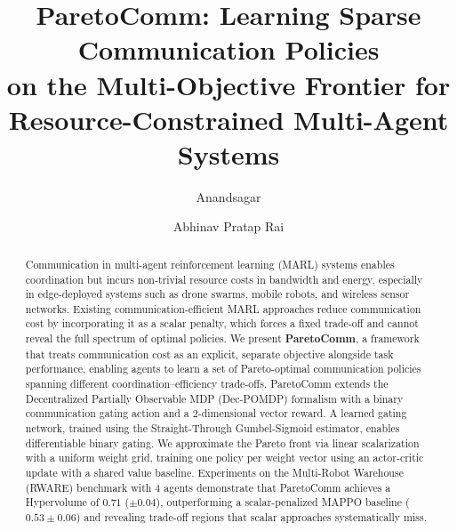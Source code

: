 \documentclass[runningheads]{llncs}
\begin{document}
\title{ParetoComm: Learning Sparse Communication Policies\\
on the Multi-Objective Frontier for\\
Resource-Constrained Multi-Agent Systems}

\author{Anandsagar \and
Abhinav Pratap Rai}



\maketitle

\begin{abstract}
Communication in multi-agent reinforcement learning (MARL) systems
enables coordination but incurs non-trivial resource costs in
bandwidth and energy, especially in edge-deployed systems such as
drone swarms, mobile robots, and wireless sensor networks.
Existing communication-efficient MARL approaches reduce communication
cost by incorporating it as a scalar penalty, which forces a fixed
trade-off and cannot reveal the full spectrum of optimal policies.
We present \textbf{ParetoComm}, a framework that treats communication
cost as an explicit, separate objective alongside task performance,
enabling agents to learn a set of Pareto-optimal communication
policies spanning different coordination--efficiency trade-offs.
ParetoComm extends the Decentralized Partially Observable MDP
(Dec-POMDP) formalism with a binary communication gating action and
a 2-dimensional vector reward.
A learned gating network, trained using the Straight-Through
Gumbel-Sigmoid estimator, enables differentiable binary gating.
We approximate the Pareto front via linear scalarization with a
uniform weight grid, training one policy per weight vector using an
actor-critic update with a shared value baseline.
Experiments on the Multi-Robot Warehouse (RWARE) benchmark with
4 agents demonstrate that ParetoComm achieves a Hypervolume of
$0.71$ ($\pm 0.04$), outperforming a scalar-penalized MAPPO baseline
($0.53 \pm 0.06$) and revealing trade-off regions that scalar
approaches systematically miss.
\end{abstract}
\end{document}
